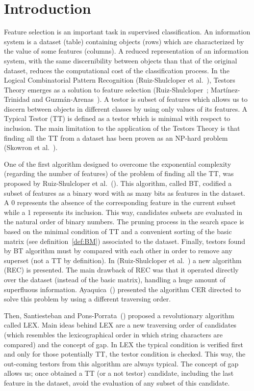 \documentclass[citeauthoryear]{llncs}
\begin{document}
\section{Introduction}
%
	Feature selection is an important task in supervised classification. An 
	information system is a dataset (table) containing objects (rows) which are
	characterized by the value of some features (columns). A reduced 
	representation of an information system, with the same discernibility
	between objects than that of the original dataset, reduces the computational
	cost of the classification process. In the Logical Combinatorial Pattern 
	Recognition (Ruiz-Shulcloper et al.~\cite{Shulcloper1995}), Testors Theory 
	emerges as a solution to feature selection (Ruiz-Shulcloper~\cite{Shulcloper2008};
	Mart\'inez-Trinidad and	Guzm\'an-Arenas~\cite{Martinez2001}). A testor is subset of 
	features which allows us to discern between objects in different classes by 
	using only values of its features. A Typical Testor (TT) is defined as a testor which 
	is minimal with respect to inclusion. The main limitation to the application of
	the Testors Theory is that finding all the TT from a dataset has been proven
	as an NP-hard problem (Skowron et al.~\cite{Skowron1992}).
	
	One of the first algorithm designed to overcome the exponential complexity (regarding
	the number of features) of the problem of finding all the TT, was 
	proposed by Ruiz-Shulcloper et al.~(\cite{Shulcloper1985}). This algorithm, called BT,
	codified a subset of features as a binary word with as many bits as features in the 
	dataset. A 0 represents the absence of the corresponding feature in the current
	subset while a 1 represents its inclusion. This way, candidates subsets are evaluated
	in the natural order of binary numbers. The pruning process in the
	search space is based on the minimal condition of TT and a convenient sorting
	of the basic matrix (see definition~\ref{def:BM}) associated to the dataset. Finally, 
	testors found by BT algorithm must by compared with each other in order to remove
	any superset (not a TT by definition).
	In (Ruiz-Shulcloper et al.~\cite{Shulcloper1995b}) a new algorithm (REC) is presented.
	The main drawback of REC was that it operated directly over the dataset (instead of the
	basic matrix), handling a huge amount of superfluous information. Ayaquica~(\cite{Ayaquica1997})
	presented the algorithm CER directed to solve this problem by using a different traversing
	order. 
	
	Then, Santiesteban and Pons-Porrata~(\cite{Santiesteban2003}) proposed a revolutionary algorithm
	called LEX. Main ideas behind LEX are a new traversing order of candidates (which resembles the
	lexicographical order in which string characters are compared) and the concept of gap. In LEX
	the typical condition is verified first and only for those potentially TT, the testor 
	condition is checked. This way, the out-coming testors from this algorithm are always typical.
	The concept of gap allows us; once obtained a TT (or a not testor) candidate, including 
	the last feature in the dataset, avoid the evaluation of any subset of this candidate.
	
\end{document}
